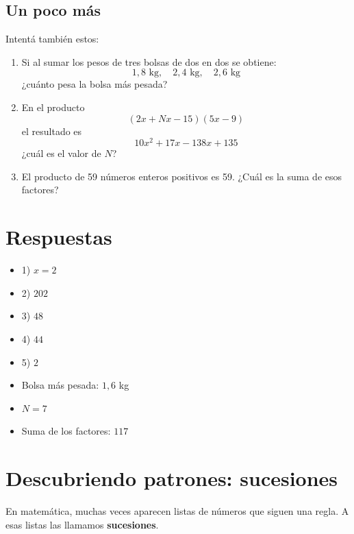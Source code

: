 \documentclass[12pt]{article}
\begin{document}
        \subsection{Un poco más}
            \begin{desafio}
                Intentá también estos:
                \begin{enumerate}
                    \item Si al sumar los pesos de tres bolsas de dos en dos se obtiene:
                    \[
                    1,8\text{ kg},\quad 2,4\text{ kg},\quad 2,6\text{ kg}
                    \]
                    ¿cuánto pesa la bolsa más pesada?

                    \item En el producto
                    \[
                    (2x+Nx-15)(5x-9)
                    \]
                    el resultado es
                    \[
                    10x^2+17x-138x+135
                    \]
                    ¿cuál es el valor de \(N\)?

                    \item El producto de 59 números enteros positivos es 59.
                    ¿Cuál es la suma de esos factores?
                \end{enumerate}
            \end{desafio}

    \newpage
    \section{Respuestas}
        \begin{itemize}
            \item 1) \(x=2\)
            \item 2) \(202\)
            \item 3) \(48\)
            \item 4) \(44\)
            \item 5) \(2\)
            \item Bolsa más pesada: \(1,6\) kg
            \item \(N=7\)
            \item Suma de los factores: \(117\)
        \end{itemize}

    \newpage
    \section{Descubriendo patrones: sucesiones}
        En matemática, muchas veces aparecen listas de números que siguen una regla.
        A esas listas las llamamos \textbf{sucesiones}.
\end{document}
